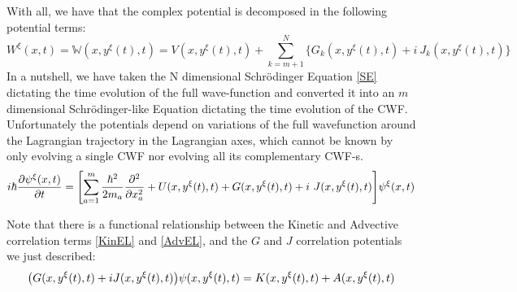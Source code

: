 \documentclass[11pt, a4paper]{article} %
\newcommand{\W}{\mathbb{W}}
\begin{document}
With all, we have that the complex potential is decomposed in the following potential terms:
$$
W^\xi(x,t)=\W(x, y^\xi(t),t)= V(x, y^\xi(t),t) + \sum_{k=m+1}^N\Big\{ G_k(x, y^\xi(t),t)+i\ J_k(x, y^\xi(t),t)\Big\}
$$
In a nutshell, we have taken the N dimensional Schrödinger Equation \eqref{SE} dictating the time evolution of the full wave-function and converted it into an $m$ dimensional Schrödinger-like Equation dictating the time evolution of the CWF. Unfortunately the potentials depend on variations of the full wavefunction around the Lagrangian trajectory in the Lagrangian axes, which cannot be known by only evolving a single CWF nor evolving all its complementary CWF-s.
\begin{equation}\label{SE.GJ}
i \hbar \pdv{\psi^\xi (x,t)}{t} = \qty[\sum_{a=1}^m\frac{\hbar^2}{2m_a} \pdv[2]{}{x_a} +  U(x, y^\xi(t),t) + G(x, y^\xi(t),t)+i\ J(x, y^\xi(t),t)] \psi^\xi (x,t)
\end{equation}

Note that there is a functional relationship between the Kinetic and Advective correlation terms \eqref{KinEL} and \eqref{AdvEL}, and the $G$ and $J$ correlation potentials we just described: 
\begin{equation}
\qty(G(x, y^\xi(t),t)+iJ(x, y^\xi(t),t))\psi(x, y^\xi(t),t)=K(x, y^\xi(t),t)+A(x, y^\xi(t),t)
\end{equation}
\end{document}
